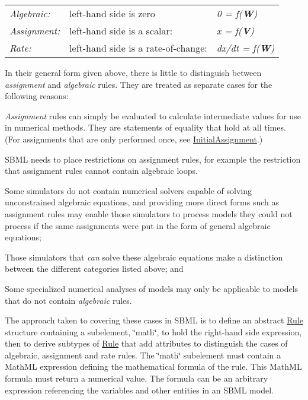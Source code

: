 \tabulinesep=1mm
\begin{longtabu} spread 0pt [c]{*{3}{|X[-1]}|}
\hline
{\itshape Algebraic\+:}&left-\/hand side is zero&{\itshape 0 = f({\bfseries W})} \\
{\itshape Assignment\+:}&left-\/hand side is a scalar\+:&{\itshape x = f({\bfseries V})} \\
{\itshape Rate\+:}&left-\/hand side is a rate-\/of-\/change\+:&{\itshape dx/dt = f({\bfseries W})} \\
\end{longtabu}


In their general form given above, there is little to distinguish between {\itshape assignment} and {\itshape algebraic} rules. They are treated as separate cases for the following reasons\+:

\begin{DoxyItemize}
\item {\itshape Assignment} rules can simply be evaluated to calculate intermediate values for use in numerical methods. They are statements of equality that hold at all times. (For assignments that are only performed once, see \hyperlink{class_initial_assignment}{Initial\+Assignment}.)\end{DoxyItemize}
\begin{DoxyItemize}
\item S\+B\+ML needs to place restrictions on assignment rules, for example the restriction that assignment rules cannot contain algebraic loops.\end{DoxyItemize}
\begin{DoxyItemize}
\item Some simulators do not contain numerical solvers capable of solving unconstrained algebraic equations, and providing more direct forms such as assignment rules may enable those simulators to process models they could not process if the same assignments were put in the form of general algebraic equations;\end{DoxyItemize}
\begin{DoxyItemize}
\item Those simulators that {\itshape can} solve these algebraic equations make a distinction between the different categories listed above; and\end{DoxyItemize}
\begin{DoxyItemize}
\item Some specialized numerical analyses of models may only be applicable to models that do not contain {\itshape algebraic} rules.\end{DoxyItemize}
The approach taken to covering these cases in S\+B\+ML is to define an abstract \hyperlink{class_rule}{Rule} structure containing a subelement, \char`\"{}math\char`\"{}, to hold the right-\/hand side expression, then to derive subtypes of \hyperlink{class_rule}{Rule} that add attributes to distinguish the cases of algebraic, assignment and rate rules. The \char`\"{}math\char`\"{} subelement must contain a Math\+ML expression defining the mathematical formula of the rule. This Math\+ML formula must return a numerical value. The formula can be an arbitrary expression referencing the variables and other entities in an S\+B\+ML model.

